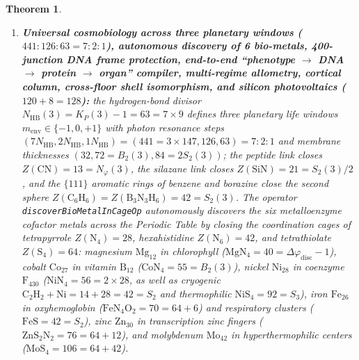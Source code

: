 \documentclass[11pt,a4paper]{article}
\theoremstyle{plain}
\newtheorem{theorem}{Theorem}[section]
\theoremstyle{definition}
\begin{document}
\begin{theorem}
\begin{enumerate}[label=\textbf{(\arabic*)},leftmargin=*]
\item \textbf{Universal cosmobiology across three planetary windows ($441 : 126 : 63 = 7 : 2 : 1$), autonomous discovery of 6 bio-metals, 400-junction DNA frame protection, end-to-end ``phenotype $\to$ DNA $\to$ protein $\to$ organ'' compiler, multi-regime allometry, cortical column, cross-floor shell isomorphism, and silicon photovoltaics ($120 + 8 = 128$):}
  the hydrogen-bond divisor $N_{\mathrm{HB}}(3) = K_P(3) - 1 = 63 = 7\times 9$ defines three planetary life windows $m_{\mathrm{env}} \in \{-1, 0, +1\}$ with photon resonance steps $(7 N_{\mathrm{HB}}, 2 N_{\mathrm{HB}}, 1 N_{\mathrm{HB}}) = (441 = 3\times 147, 126, 63) = 7 : 2 : 1$ and membrane thicknesses $(32, 72 = B_2(3), 84 = 2 S_2(3))$; the peptide link closes $Z(\mathrm{CN}) = 13 = N_\varphi(3)$, the silazane link closes $Z(\mathrm{SiN}) = 21 = S_2(3)/2$, and the $\{111\}$ aromatic rings of benzene and borazine close the second sphere $Z(\mathrm{C_6H_6}) = Z(\mathrm{B_3N_3H_6}) = 42 = S_2(3)$. The operator \texttt{discoverBioMetalInCageOp} autonomously discovers the six metalloenzyme cofactor metals across the Periodic Table by closing the coordination cages of tetrapyrrole $Z(\mathrm{N_4}) = 28$, hexahistidine $Z(\mathrm{N_6}) = 42$, and tetrathiolate $Z(\mathrm{S_4}) = 64$: magnesium $\mathrm{Mg}_{12}$ in chlorophyll ($\mathrm{MgN_4} = 40 = \Delta\varphi_{\mathrm{disc}} - 1$), cobalt $\mathrm{Co}_{27}$ in vitamin $\mathrm{B}_{12}$ ($\mathrm{CoN_4} = 55 = B_2(3)$), nickel $\mathrm{Ni}_{28}$ in coenzyme $\mathrm{F}_{430}$ ($\mathrm{NiN_4} = 56 = 2\times 28$, as well as cryogenic $\mathrm{C_2H_2 + Ni} = 14 + 28 = 42 = S_2$ and thermophilic $\mathrm{NiS_4} = 92 = S_3$), iron $\mathrm{Fe}_{26}$ in oxyhemoglobin ($\mathrm{FeN_4O_2} = 70 = 64 + 6$) and respiratory clusters ($\mathrm{FeS} = 42 = S_2$), zinc $\mathrm{Zn}_{30}$ in transcription zinc fingers ($\mathrm{ZnS_2N_2} = 76 = 64 + 12$), and molybdenum $\mathrm{Mo}_{42}$ in hyperthermophilic centers ($\mathrm{MoS_4} = 106 = 64 + 42$).


\end{enumerate}
\end{theorem}
\end{document}
